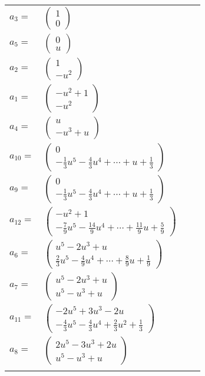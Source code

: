 \documentclass[1p]{elsarticle_modified}
\theoremstyle{definition}
\begin{document}
\begin{tabular}{m{7pt} m{180pt} m{7pt} m{180pt} }
\flushright $a_{3}=$&$\begin{pmatrix}1\\0\end{pmatrix}$ \\
\flushright $a_{5}=$&$\begin{pmatrix}0\\u\end{pmatrix}$ \\
\flushright $a_{2}=$&$\begin{pmatrix}1\\- u^2\end{pmatrix}$ \\
\flushright $a_{1}=$&$\begin{pmatrix}- u^2+1\\- u^2\end{pmatrix}$ \\
\flushright $a_{4}=$&$\begin{pmatrix}u\\- u^3+u\end{pmatrix}$ \\
\flushright $a_{10}=$&$\begin{pmatrix}0\\-\frac{1}{3} u^5-\frac{4}{3} u^4+\cdots+u+\frac{1}{3}\end{pmatrix}$ \\
\flushright $a_{9}=$&$\begin{pmatrix}0\\-\frac{1}{3} u^5-\frac{4}{3} u^4+\cdots+u+\frac{1}{3}\end{pmatrix}$ \\
\flushright $a_{12}=$&$\begin{pmatrix}- u^2+1\\-\frac{7}{9} u^5-\frac{14}{9} u^4+\cdots+\frac{11}{9} u+\frac{5}{9}\end{pmatrix}$ \\
\flushright $a_{6}=$&$\begin{pmatrix}u^5-2 u^3+u\\\frac{2}{3} u^5-\frac{4}{9} u^4+\cdots+\frac{8}{9} u+\frac{1}{9}\end{pmatrix}$ \\
\flushright $a_{7}=$&$\begin{pmatrix}u^5-2 u^3+u\\u^5- u^3+u\end{pmatrix}$ \\
\flushright $a_{11}=$&$\begin{pmatrix}-2 u^5+3 u^3-2 u\\-\frac{4}{3} u^5-\frac{4}{3} u^4+\frac{2}{3} u^2+\frac{1}{3}\end{pmatrix}$ \\
\flushright $a_{8}=$&$\begin{pmatrix}2 u^5-3 u^3+2 u\\u^5- u^3+u\end{pmatrix}$\\&\end{tabular}
\end{document}
